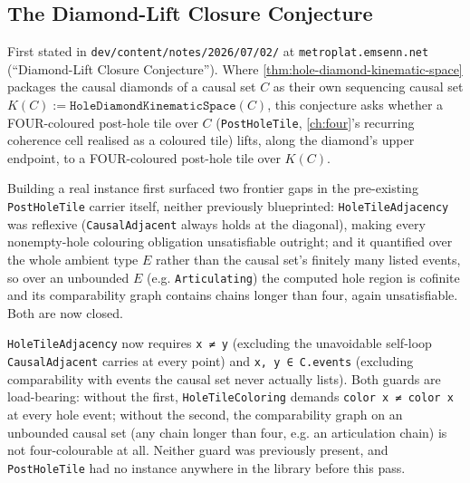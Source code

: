 \subsection{The Diamond-Lift Closure Conjecture}

First stated in \texttt{dev/content/notes/2026/07/02/} at \texttt{metroplat.emsenn.net}
(``Diamond-Lift Closure Conjecture''). Where \cref{thm:hole-diamond-kinematic-space} packages the
causal diamonds of a causal set $C$ as their own sequencing causal set
$K(C) := \texttt{HoleDiamondKinematicSpace}(C)$, this conjecture asks whether a FOUR-coloured
post-hole tile over $C$ (\texttt{PostHoleTile}, \cref{ch:four}'s recurring coherence cell realised
as a coloured tile) lifts, along the diamond's upper endpoint, to a FOUR-coloured post-hole tile
over $K(C)$.

Building a real instance first surfaced two frontier gaps in the pre-existing \texttt{PostHoleTile}
carrier itself, neither previously blueprinted: \texttt{HoleTileAdjacency} was reflexive
(\texttt{CausalAdjacent} always holds at the diagonal), making every nonempty-hole colouring
obligation unsatisfiable outright; and it quantified over the whole ambient type $E$ rather than
the causal set's finitely many listed events, so over an unbounded $E$ (e.g. \texttt{Articulating})
the computed hole region is cofinite and its comparability graph contains chains longer than four,
again unsatisfiable. Both are now closed.

\begin{theorem}\label{thm:post-hole-tile-adjacency-fixed}\leanok
\texttt{HoleTileAdjacency} now requires \texttt{x ≠ y} (excluding the unavoidable self-loop
\texttt{CausalAdjacent} carries at every point) and \texttt{x, y ∈ C.events} (excluding
comparability with events the causal set never actually lists). Both guards are load-bearing:
without the first, \texttt{HoleTileColoring} demands \texttt{color x ≠ color x} at every hole
event; without the second, the comparability graph on an unbounded causal set (any chain longer
than four, e.g. an articulation chain) is not four-colourable at all. Neither guard was previously
present, and \texttt{PostHoleTile} had no instance anywhere in the library before this pass.
\end{theorem}

